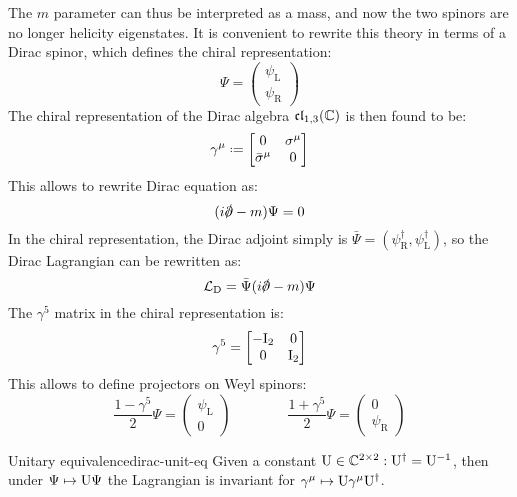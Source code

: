 The $ m $ parameter can thus be interpreted as a mass, and now the two spinors are no longer helicity eigenstates. It is convenient to rewrite this theory in terms of a Dirac spinor, which defines the chiral representation:
\begin{equation*}
  \Psi =
  \begin{pmatrix}
    \psi_\text{L} \\
    \psi_\text{R}
  \end{pmatrix}
\end{equation*}
The chiral representation of the Dirac algebra $ \mathfrak{cl}_{1,3}(\mathbb{C}) $ is then found to be:
\begin{equation*}
  \gamma^\mu \defeq
  \begin{bmatrix}
    0 & \sigma^\mu \\
    \bar{\sigma}^\mu & 0
  \end{bmatrix}
\end{equation*}
This allows to rewrite Dirac equation as:
\begin{equation}
  (i \slashed{\pa} - m) \Psi = 0
\end{equation}
In the chiral representation, the Dirac adjoint simply is $ \bar{\Psi} = (\psi_\text{R}^\dagger, \psi_\text{L}^\dagger) $, so the Dirac Lagrangian can be rewritten as:
\begin{equation}
  \mathcal{L}_\text{D} = \bar{\Psi} (i \slashed{\pa} - m) \Psi
  \label{eq:dirac-lagrangian}
\end{equation}
The $ \gamma^5 $ matrix in the chiral representation is:
\begin{equation*}
  \gamma^5 =
  \begin{bmatrix}
    -\mathrm{I}_2 & 0 \\ 0 & \mathrm{I}_2
  \end{bmatrix}
\end{equation*}
This allows to define projectors on Weyl spinors:
\begin{equation}
  \frac{1 - \gamma^5}{2} \Psi =
  \begin{pmatrix}
    \psi_\text{L} \\ 0
  \end{pmatrix}
  \qquad \qquad
  \frac{1 + \gamma^5}{2} \Psi =
  \begin{pmatrix}
    0 \\ \psi_\text{R}
  \end{pmatrix}
\end{equation}

\begin{proposition}{Unitary equivalence}{dirac-unit-eq}
  Given a constant $ \mathrm{U} \in \mathbb{C}^{2 \times 2} : \mathrm{U}^\dagger = \mathrm{U}^{-1} $, then under $ \Psi \mapsto \mathrm{U} \Psi $ the Lagrangian is invariant for $ \gamma^\mu \mapsto \mathrm{U} \gamma^\mu \mathrm{U}^\dagger $.
\end{proposition}

